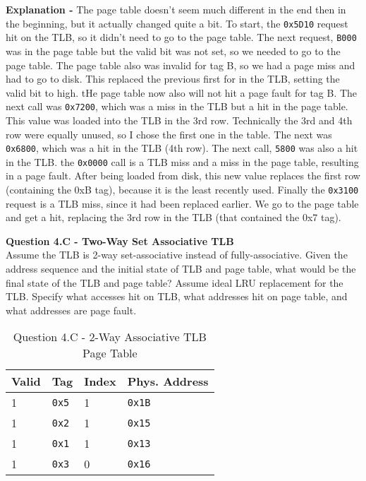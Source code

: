 \documentclass[a4paper,11pt]{article}
\newcommand{\T}{\texttt}
\begin{document}
\textbf{Explanation - } The page table doesn't seem much different in the end then in the beginning, but it actually changed quite a bit. To start, the \T{0x5D10} request hit on the TLB, so it didn't need to go to the page table. The next request, \T{B000} was in the page table but the valid bit was not set, so we needed to go to the page table. The page table also was invalid for tag B, so we had a page miss and had to go to disk. This replaced the previous first for in the TLB, setting the valid bit to high. tHe page table now also will not hit a page fault for tag B. The next call was \T{0x7200}, which was a miss in the TLB but a hit in the page table. This value was loaded into the TLB in the 3rd row. Technically the 3rd and 4th row were equally unused, so I chose the first one in the table. The next was \T{0x6800}, which was a hit in the TLB (4th row). The next call, \T{5800} was also a hit in the TLB. the \T{0x0000} call is a TLB miss and a miss in the page table, resulting in a page fault. After being loaded from disk, this new value replaces the first row (containing the 0xB tag), because it is the least recently used. Finally the \T{0x3100} request is a TLB miss, since it had been replaced earlier. We go to the page table and get a hit, replacing the 3rd row in the TLB (that contained the 0x7 tag). \\


\item \textbf{Question 4.C - Two-Way Set Associative TLB} \\

Assume the TLB is 2-way set-associative instead of fully-associative. Given the address sequence and the initial state of TLB and page table, what would be the final state of the TLB and page table? Assume ideal LRU replacement for the TLB. Specify what accesses hit on TLB, what addresses hit on page table, and what addresses are page fault. \\

\begin{table}[H]
\caption{ Question 4.C - 2-Way Associative TLB Page Table} \label{tab:q4Ctables} 
\begin{center}
\begin{tabular}{| l | l | l | l |}
\hline
  Valid  &  Tag       &  Index   & Phys. Address    \\ \hline
  1      &   \T{0x5}  &    1     &  \T{0x1B}         \\ \hline
  1      &   \T{0x2}  &    1     &  \T{0x15}         \\ \hline
  1      &   \T{0x1}  &    1     &  \T{0x13}         \\ \hline
  1      &   \T{0x3}  &    0     &  \T{0x16}         \\ \hline
\end{tabular}
\end{center}
\end{table}
\end{document}
